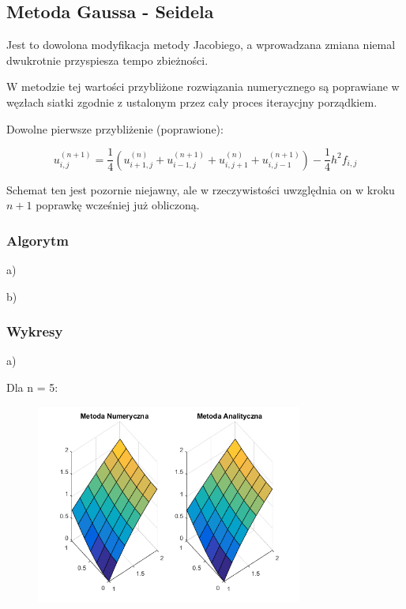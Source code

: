 \newpage
\subsection{Metoda Gaussa - Seidela	}

Jest to dowolona modyfikacja metody Jacobiego, a wprowadzana zmiana niemal dwukrotnie przyspiesza tempo zbieżności.

W metodzie tej wartości przybliżone rozwiązania numerycznego są poprawiane w węzłach siatki zgodnie z ustalonym przez cały proces iteraycjny porządkiem.

Dowolne pierwsze przybliżenie (poprawione):

$$u_{i,j}^{(n+1)} = \frac{1}{4}(u_{i+1,j}^{(n)} + u_{i-1,j}^{(n+1)} + u_{i,j+1}^{(n)} + u_{i,j-1}^{(n+1)}) - \frac{1}{4}h^2f_{i,j}$$

Schemat ten jest pozornie niejawny, ale w rzeczywistości uwzględnia on w kroku $n+1$ poprawkę wcześniej już obliczoną.
\newpage
\subsubsection{Algorytm}

a)


\newpage
b)


\newpage
\subsubsection{Wykresy}

a)

Dla n = 5:

\begin{figure}[!ht]
	\begin{center}
		\includegraphics[width=0.78\textwidth]{Lab6/charts/gs/zad1/5.png}
	\end{center}
\end{figure}

